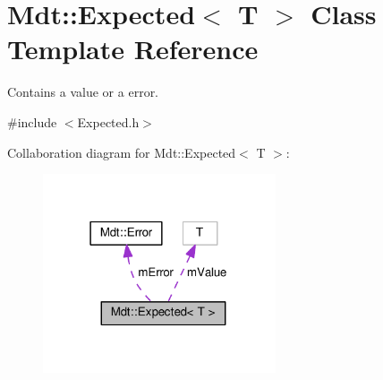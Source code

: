 \hypertarget{class_mdt_1_1_expected}{}\section{Mdt\+:\+:Expected$<$ T $>$ Class Template Reference}
\label{class_mdt_1_1_expected}


Contains a value or a error.  




{\ttfamily \#include $<$Expected.\+h$>$}



Collaboration diagram for Mdt\+:\+:Expected$<$ T $>$\+:
\nopagebreak
\begin{figure}[H]
\begin{center}
\leavevmode
\includegraphics[width=195pt]{class_mdt_1_1_expected__coll__graph}
\end{center}
\end{figure}
